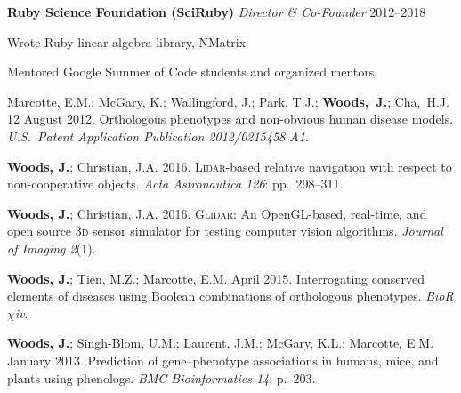 \documentclass[12pt,letterpaper]{article}
\newenvironment{itemize*}%
{\begin{itemize}%
  \setlength{\itemsep}{0pt}}%
{\end{itemize}}
\newcommand{\mhead}[1]{\leavevmode\marginpar{\sffamily\footnotesize #1}}
\newcommand{\rdate}[1]{{\hfill #1}}
\begin{document}
\medskip
\textbf{Ruby Science Foundation (SciRuby)} \newline %
\emph{Director \& Co-Founder} \rdate{2012--2018}
\begin{itemize*}
  \item Wrote Ruby linear algebra library, NMatrix
  \item Mentored Google Summer of Code students and organized mentors
\end{itemize*}

%


\bigskip
\mhead{Patents}%
\par\vspace{-\baselineskip}Marcotte, E.M.; McGary, K.; Wallingford, J.; Park, T.J.; \textbf{Woods,~J.}; Cha,~H.J. 12 August 2012. Orthologous phenotypes and non-obvious human disease models. \textit{U.S.\ Patent Application Publication 2012/0215458 A1}.


\bigskip
\mhead{Articles}%
\par\vspace{-\baselineskip}%
\par\textbf{Woods, J.}; Christian, J.A. 2016. \textsc{Lidar}-based relative navigation with respect to non-cooperative objects. \textit{Acta Astronautica 126}: pp.\ 298--311.

\medskip
\par\textbf{Woods, J.}; Christian, J.A. 2016. \textsc{Glidar}: An OpenGL-based, real-time, and open source 3\textsc{d} sensor simulator for testing computer vision algorithms. \textit{Journal of Imaging 2}(1).

\medskip
\par\textbf{Woods, J.}; Tien, M.Z.; Marcotte, E.M. April 2015. Interrogating conserved elements of diseases using Boolean combinations of orthologous phenotypes. \textit{BioR$\chi$iv}.

\medskip
\par\textbf{Woods, J.}; Singh-Blom, U.M.; Laurent, J.M.; McGary, K.L.; Marcotte, E.M. January 2013. Prediction of gene--phenotype associations in humans, mice, and plants using phenologs. \textit{BMC Bioinformatics 14}: p.\ 203.
\end{document}
